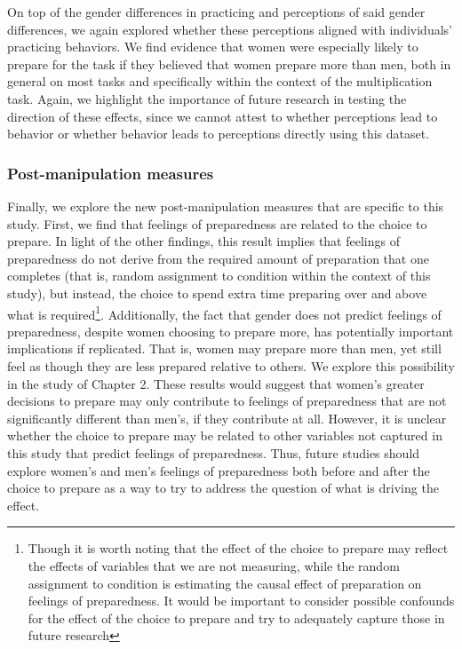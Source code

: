 \documentclass[letterpaper, nobind]{templates/ociamthesis}
\begin{document}
On top of the gender differences in practicing and perceptions of said gender differences, we again explored whether these perceptions aligned with individuals' practicing behaviors. We find evidence that women were especially likely to prepare for the task if they believed that women prepare more than men, both in general on most tasks and specifically within the context of the multiplication task. Again, we highlight the importance of future research in testing the direction of these effects, since we cannot attest to whether perceptions lead to behavior or whether behavior leads to perceptions directly using this dataset.

\hypertarget{post-manipulation-measures-1}{%
\subsubsection{Post-manipulation measures}\label{post-manipulation-measures-1}}

Finally, we explore the new post-manipulation measures that are specific to this study. First, we find that feelings of preparedness are related to the choice to prepare. In light of the other findings, this result implies that feelings of preparedness do not derive from the required amount of preparation that one completes (that is, random assignment to condition within the context of this study), but instead, the choice to spend extra time preparing over and above what is required\footnote{Though it is worth noting that the effect of the choice to prepare may reflect the effects of variables that we are not measuring, while the random assignment to condition is estimating the causal effect of preparation on feelings of preparedness. It would be important to consider possible confounds for the effect of the choice to prepare and try to adequately capture those in future research}. Additionally, the fact that gender does not predict feelings of preparedness, despite women choosing to prepare more, has potentially important implications if replicated. That is, women may prepare more than men, yet still feel as though they are less prepared relative to others. We explore this possibility in the study of Chapter 2. These results would suggest that women's greater decisions to prepare may only contribute to feelings of preparedness that are not significantly different than men's, if they contribute at all. However, it is unclear whether the choice to prepare may be related to other variables not captured in this study that predict feelings of preparedness. Thus, future studies should explore women's and men's feelings of preparedness both before and after the choice to prepare as a way to try to address the question of what is driving the effect.
\end{document}
